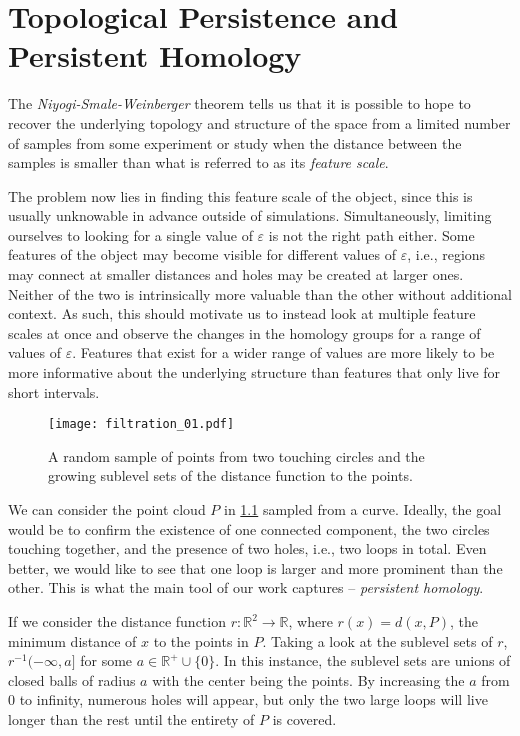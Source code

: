 \chapter{Topological Persistence and Persistent Homology}
\graphicspath{ {/home/tomasp/Dokumenty/Master_Thesis/figures/} }

The \textit{Niyogi-Smale-Weinberger} theorem tells us that it is possible to hope to recover the underlying topology and structure of the space from a limited number of samples from some experiment or study when the distance between the samples is smaller than what is referred to as its \textit{feature scale}.

The problem now lies in finding this feature scale of the object, since this is usually unknowable in advance outside of simulations. Simultaneously, limiting ourselves to looking for a single value of $\varepsilon$ is not the right path either. Some features of the object may become visible for different values of $\varepsilon$, i.e., regions may connect at smaller distances and holes may be created at larger ones. Neither of the two is intrinsically more valuable than the other without additional context. As such, this should motivate us to instead look at multiple feature scales at once and observe the changes in the homology groups for a range of values of $\varepsilon$. Features that exist for a wider range of values are more likely to be more informative about the underlying structure than features that only live for short intervals.

\begin{figure}[h!]
  \centering
  \texttt{[image: filtration\_01.pdf]}
  \caption{A random sample of points from two touching circles and the growing sublevel sets of the distance function to the points.}
  \label{fig:filtration_01}
\end{figure}

We can consider the point cloud $P$ in \ref{fig:filtration_01} sampled from a curve. Ideally, the goal would be to confirm the existence of one connected component, the two circles touching together, and the presence of two holes, i.e., two loops in total. Even better, we would like to see that one loop is larger and more prominent than the other. This is what the main tool of our work captures -- \textit{persistent homology}.

If we consider the distance function $r: \mathbb{R}^{2} \to \mathbb{R}$, where $r(x) = d(x, P)$, the minimum distance of $x$ to the points in $P$. Taking a look at the sublevel sets of $r$, $r^{-1}(-\infty, a]$ for some $a \in \mathbb{R}^{+} \cup \{0\}$. In this instance, the sublevel sets are unions of closed balls of radius $a$ with the center being the points. By increasing the $a$ from $0$ to infinity, numerous holes will appear, but only the two large loops will live longer than the rest until the entirety of $P$ is covered.

